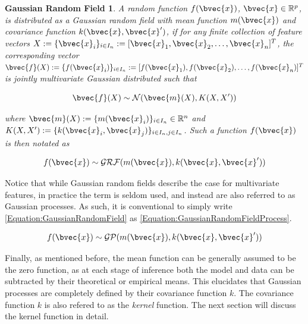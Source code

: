 			\newtheorem{grfdef}{Gaussian Random Field}[section]
			\begin{grfdef}
				A random function $f(\bvec{x})$, $\bvec{x} \in \mathbb{R}^{p}$, is distributed as a Gaussian random field with mean function $m(\bvec{x})$ and covariance function $k(\bvec{x}, \bvec{x}')$, if for any finite collection of feature vectors $X := \{\bvec{x}_{i}\}_{i \in I_{n}} := [\bvec{x}_{1}, \bvec{x}_{2}, \dots, \bvec{x}_{n}]^{T}$, the corresponding vector $\bvec{f}(X) := \{f(\bvec{x}_{i})\}_{i \in I_{n}} := [f(\bvec{x}_{1}), f(\bvec{x}_{2}), \dots, f(\bvec{x}_{n})]^{T}$ is jointly multivariate Gaussian distributed such that 

					\begin{equation}
						\bvec{f}(X) \sim \mathcal{N}(\bvec{m}(X), K(X, X'))
					\label{Equation:GaussianRandomFieldFiniteDistribution}
					\end{equation}	
				
				where $\bvec{m}(X) :=  \{m(\bvec{x}_{i})\}_{i \in I_{n}} \in \mathbb{R}^{n}$ and $K(X, X') := \{k(\bvec{x}_{i}, \bvec{x}_{j})\}_{i \in I_{n}, j \in I_{n}}$. Such a function $f(\bvec{x})$ is then notated as
				
					\begin{equation}
						f(\bvec{x}) \sim \mathcal{GRF}(m(\bvec{x}), k(\bvec{x}, \bvec{x}'))
					\label{Equation:GaussianRandomField}
					\end{equation}	
					
			\label{Definition:GaussianRandomField}
			\end{grfdef}
			
			Notice that while Gaussian random fields describe the case for multivariate features, in practice the term is seldom used, and instead are also referred to as Gaussian processes. As such, it is conventional to simply write \eqref{Equation:GaussianRandomField} as \eqref{Equation:GaussianRandomFieldProcess}.
	
				\begin{equation}
					f(\bvec{x}) \sim \mathcal{GP}(m(\bvec{x}), k(\bvec{x}, \bvec{x}'))
				\label{Equation:GaussianRandomFieldProcess}
				\end{equation}	
							
			Finally, as mentioned before, the mean function can be generally assumed to be the zero function, as at each stage of inference both the model and data can be subtracted by their theoretical or empirical means. This elucidates that Gaussian processes are completely defined by their covariance function $k$. The covariance function $k$ is also refered to as the \textit{kernel} function. The next section will discuss the kernel function in detail.
			
